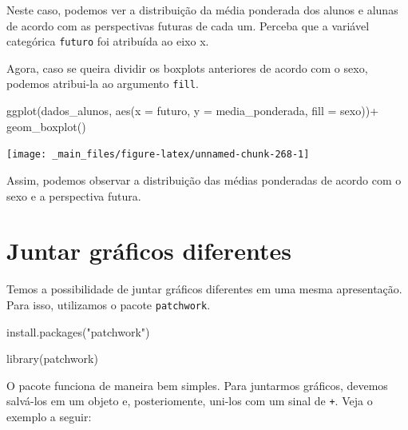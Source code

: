 \documentclass[
  brazilian,
]{book}
\newenvironment{Shaded}{\begin{snugshade}}{\end{snugshade}}
\newcommand{\AttributeTok}[1]{\textcolor[rgb]{0.77,0.63,0.00}{#1}}
\newcommand{\FunctionTok}[1]{\textcolor[rgb]{0.00,0.00,0.00}{#1}}
\newcommand{\NormalTok}[1]{#1}
\newcommand{\SpecialCharTok}[1]{\textcolor[rgb]{0.00,0.00,0.00}{#1}}
\newcommand{\StringTok}[1]{\textcolor[rgb]{0.31,0.60,0.02}{#1}}
\begin{document}
Neste caso, podemos ver a distribuição da média ponderada dos alunos e alunas de acordo com as perspectivas futuras de cada um. Perceba que a variável categórica \texttt{futuro} foi atribuída ao eixo x.

Agora, caso se queira dividir os boxplots anteriores de acordo com o sexo, podemos atribui-la ao argumento \texttt{fill}.

\begin{Shaded}
\begin{Highlighting}[]
\FunctionTok{ggplot}\NormalTok{(dados\_alunos,}
       \FunctionTok{aes}\NormalTok{(}\AttributeTok{x =}\NormalTok{ futuro,}
           \AttributeTok{y =}\NormalTok{ media\_ponderada,}
           \AttributeTok{fill =}\NormalTok{ sexo))}\SpecialCharTok{+}
  \FunctionTok{geom\_boxplot}\NormalTok{()}
\end{Highlighting}
\end{Shaded}

\begin{center}\texttt{[image: \_main\_files/figure-latex/unnamed-chunk-268-1]} \end{center}

Assim, podemos observar a distribuição das médias ponderadas de acordo com o sexo e a perspectiva futura.

\hypertarget{juntar-gruxe1ficos-diferentes}{%
\section{Juntar gráficos diferentes}\label{juntar-gruxe1ficos-diferentes}}

Temos a possibilidade de juntar gráficos diferentes em uma mesma apresentação. Para isso, utilizamos o pacote \texttt{patchwork}.

\begin{Shaded}
\begin{Highlighting}[]
\FunctionTok{install.packages}\NormalTok{(}\StringTok{"patchwork"}\NormalTok{)}
\end{Highlighting}
\end{Shaded}

\begin{Shaded}
\begin{Highlighting}[]
\FunctionTok{library}\NormalTok{(patchwork)}
\end{Highlighting}
\end{Shaded}

O pacote funciona de maneira bem simples. Para juntarmos gráficos, devemos salvá-los em um objeto e, posteriomente, uni-los com um sinal de \texttt{+}. Veja o exemplo a seguir:
\end{document}
